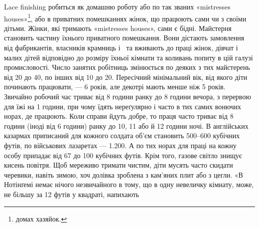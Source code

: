 Lace finishing робиться як домашню роботу або по так званих
«\textenglish{mistresses houses}»\footnote*{
домах хазяйок. 
}, або в приватних помешканнях жінок, що
працюють сами чи з своїми дітьми. Жінки, які тримають «\textenglish{mistresses houses}», сами є бідні. Майстерня становить частину їхнього
приватного помешкання. Вони дістають замовлення від фабрикантів,
власників крамниць і~ та вживають до праці жінок,
дівчат і малих дітей відповідно до розміру їхньої кімнати та коливань
попиту в цій галузі промисловості. Число занятих робітниць
змінюється по деяких з тих майстерень від 20 до 40, по інших від
10 до 20. Пересічний мінімальний вік, від якого діти починають
працювати, — 6 років, але декотрі мають менше ніж 5 років. Звичайно
робочий час триває від 8 години ранку до 8 години вечора,
з перервою для їжі на 1 години, при чому їдять нереґулярно
і часто в тих самих вонючих норах, де працюють. Коли справи
йдуть добре, то праця часто триває від 8 години (іноді від 6 години)
ранку до 10, 11 або й 12 години ночі. В англійських казармах
приписаний для кожного солдата об’єм становить 500--600 кубічних
футів, по військових лазаретах — \num{1.200}. А по тих норах
для праці на кожну особу припадає від 67 до 100 кубічних
футів. Крім того, газове світло знищує кисень повітря. Щоб
мереживо тримати чистим, діти мусять часто скидати черевики,
навіть зимою, хоч долівка зроблена з кам’яних плит або з цегли.
«В Нотінґемі немає нічого незвичайного в тому, що в одну невеличку
кімнату, може, не більшу за 12 футів у квадраті, напихають
\parbreak{}  %
